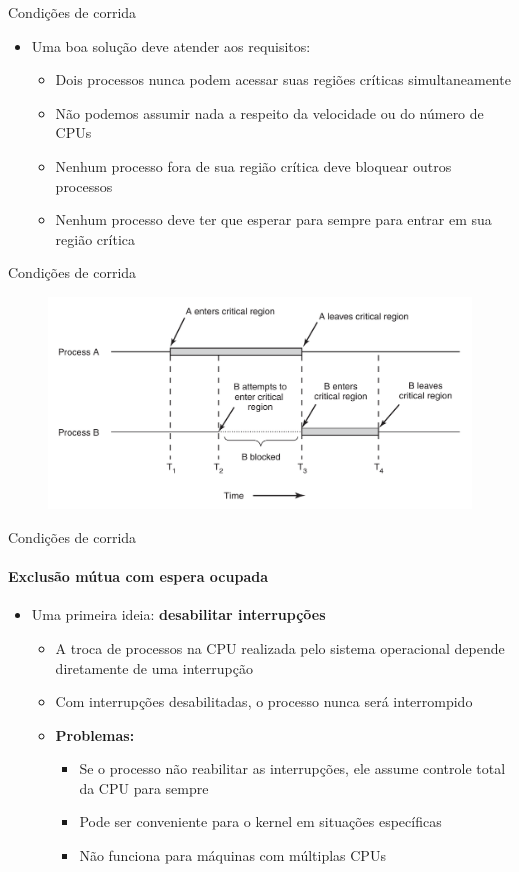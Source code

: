 \documentclass{beamer}
\begin{document}
\begin{frame}{Condições de corrida}
	\begin{itemize}
		\item Uma boa solução deve atender aos requisitos:
		\begin{itemize}
			\item Dois processos nunca podem acessar suas regiões críticas simultaneamente
			\item Não podemos assumir nada a respeito da velocidade ou do número de CPUs
			\item Nenhum processo fora de sua região crítica deve bloquear outros processos
			\item Nenhum processo deve ter que esperar para sempre para entrar em sua região crítica
		\end{itemize}
	\end{itemize}
\end{frame}
\begin{frame}{Condições de corrida}
	\begin{figure}
		\includegraphics[width=0.9\paperwidth]{resources/critical}
	\end{figure}
\end{frame}
\begin{frame}{Condições de corrida}
	\framesubtitle{Exclusão mútua com espera ocupada}
	\begin{itemize}
		\item Uma primeira ideia: \textbf{desabilitar interrupções}
		\begin{itemize}
			\item A troca de processos na CPU realizada pelo sistema operacional depende diretamente de uma interrupção
			\item Com interrupções desabilitadas, o processo nunca será interrompido\pause
			\item \textbf{Problemas:}
			\begin{itemize}
				\item Se o processo não reabilitar as interrupções, ele assume controle total da CPU para sempre
				\item Pode ser conveniente para o kernel em situações específicas
				\item Não funciona para máquinas com múltiplas CPUs
			\end{itemize}
		\end{itemize}
	\end{itemize}
\end{frame}
\end{document}
